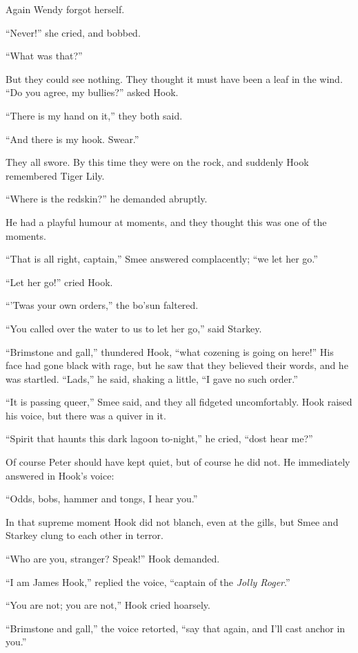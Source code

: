Again Wendy forgot herself.

“Never!\@” she cried, and bobbed.

“What was that?”

But they could see nothing.
They thought it must have been a leaf in the wind.
“Do you agree, my bullies?\@” asked Hook.

“There is my hand on it,” they both said.

“And there is my hook.
Swear.”

They all swore.
By this time they were on the rock, and suddenly Hook remembered Tiger Lily.

“Where is the redskin?\@” he demanded abruptly.

He had a playful humour at moments, and they thought this was one of the moments.

“That is all right, captain,” Smee answered complacently;
“we let her go.”

“Let her go!\@” cried Hook.

“’Twas your own orders,” the bo’sun faltered.

“You called over the water to us to let her go,” said Starkey.

“Brimstone and gall,” thundered Hook, “what cozening is going on here!”
His face had gone black with rage, but he saw that they believed their words, and he was startled.
“Lads,” he said, shaking a little, “I gave no such order.”

“It is passing queer,” Smee said, and they all fidgeted uncomfortably.
Hook raised his voice, but there was a quiver in it.

“Spirit that haunts this dark lagoon to-night,” he cried, “dost hear me?”

Of course Peter should have kept quiet, but of course he did not.
He immediately answered in Hook’s voice:

“Odds, bobs, hammer and tongs, I hear you.”

In that supreme moment Hook did not blanch, even at the gills,
but Smee and Starkey clung to each other in terror.

“Who are you, stranger?
Speak!\@” Hook demanded.

“I am James Hook,” replied the voice, “captain of the \emph{Jolly Roger}.”

“You are not;
you are not,” Hook cried hoarsely.

“Brimstone and gall,” the voice retorted, “say that again, and I’ll cast anchor in you.”

